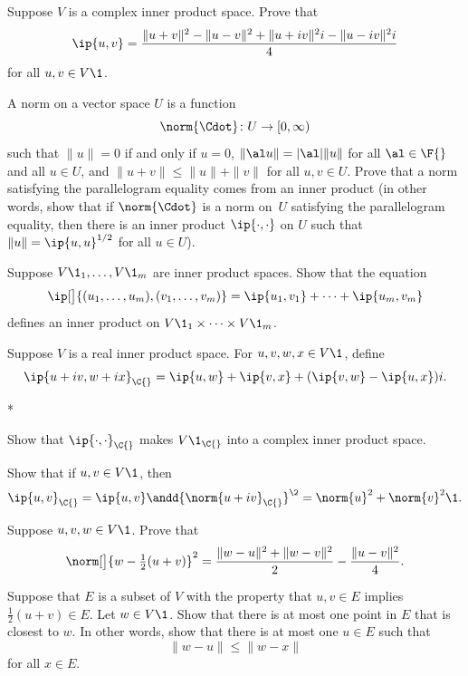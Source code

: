 \exercise
Suppose $V$ is a complex inner product space. Prove that \label{202}
\[
\ip{u, v} =
\frac{\|u + v\|^2 - \|u - v\|^2 + \|u + iv\|^2 i - \|u -iv\|^2 i}{4}
\]
for all $u, v \in V\1$.


\exercise
A norm on a vector space $U$ is a function
\[
\norm{ \Cdot } \colon U \rightarrow [0, \infty)
\]
such that $\|u\| = 0$ if and only if
$u = 0$, $\|\al u\| = |\al| \|u\|$ for all
$\al \in \F{}$ and all $u \in U$, and $\|u + v\| \le \|u\| + \|v\|$ for all
$u, v \in U$.
Prove that a norm satisfying  the parallelogram equality comes from  an
inner product \big(in other words, show that if $\norm{\Cdot}$ is a norm  on~$U$
satisfying the parallelogram equality, then there is an inner product
$\ip{\cdot ,\cdot }$ on $U$ such that $\|u\| = \ip{u,u}^{1/2}$ for all
$u \in U$\big).


\exercise
Suppose $V\1_1, \dots, V\1_m$ are inner product spaces. Show that the equation
\[
\ip[\big]{(u_1, \dots, u_m), (v_1, \dots, v_m)} =
\ip{u_1, v_1} + \dots + \ip{u_m, v_m}
\]
defines an inner product on $V\1_1 \times \dots \times V\1_m$.


\exercise
Suppose $V$ is a real inner product space. For $u, v, w, x\in V\1$, define
\[
\ip{u+iv, w + ix}_{\C{}} = \ip{u,w} + \ip{v,x} + (\ip{v,w} - \ip{u,x})i.
\]
\begin{subtheorem}*
\item
Show that $\ip{\cdot, \cdot}_{\C{}}$ makes $V\1_{\C{}}$ into a complex inner product space.
\item
Show that if $u, v \in V\1$, then
\[
\ip{u, v}_{\C{}} = \ip{u, v} \andd {\norm{u + iv}_{\C{}}}^{\2} = \norm{u}^2 + \norm{v}^2\1.
\]
\end{subtheorem}


\exercise
Suppose $u, v, w \in V\1$. Prove that\label{6wuv}
\[
\norm[\big]{w - \tfrac{1}{2}(u+v)}^2 = \frac{\|w-u\|^2 + \|w-v\|^2}{2} -\frac{\|u-v\|^2}{4}.
\vspace{-.05in}
\]


\exercise
Suppose that $E$ is a subset of $V$ with the property that $u , v \in E$ implies $\frac{1}{2}(u + v) \in E$. Let $w \in V\1$. Show that there is at most one point in $E$ that is closest to $w$. In other words, show that there is at most one $u \in E$ such that
\[
\|w - u\| \le \|w - x\|
\]
for all $x \in E$.


